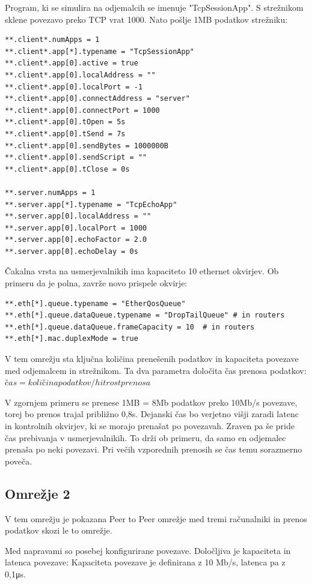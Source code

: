 \documentclass[11pt,a4paper,slovene]{myarticle}
\begin{document}
Program, ki se simulira na odjemalcih se imenuje "TcpSessionApp". S strežnikom sklene povezavo preko TCP vrat 1000. Nato pošlje 1MB podatkov strežniku:
\begin{lstlisting}[h]
**.client*.numApps = 1
**.client*.app[*].typename = "TcpSessionApp"
**.client*.app[0].active = true
**.client*.app[0].localAddress = ""
**.client*.app[0].localPort = -1
**.client*.app[0].connectAddress = "server"
**.client*.app[0].connectPort = 1000
**.client*.app[0].tOpen = 5s
**.client*.app[0].tSend = 7s
**.client*.app[0].sendBytes = 1000000B
**.client*.app[0].sendScript = ""
**.client*.app[0].tClose = 0s

**.server.numApps = 1
**.server.app[*].typename = "TcpEchoApp"
**.server.app[0].localAddress = ""
**.server.app[0].localPort = 1000
**.server.app[0].echoFactor = 2.0
**.server.app[0].echoDelay = 0s
\end{lstlisting}

Čakalna vrsta na usmerjevalnikih ima kapaciteto 10 ethernet okvirjev. Ob primeru da je polna, zavrže novo prispele okvirje:
\begin{lstlisting}[h]
**.eth[*].queue.typename = "EtherQosQueue"
**.eth[*].queue.dataQueue.typename = "DropTailQueue" # in routers
**.eth[*].queue.dataQueue.frameCapacity = 10  # in routers
**.eth[*].mac.duplexMode = true
\end{lstlisting}

V tem omrežju sta ključna količina prenešenih podatkov in kapaciteta povezave med odjemalcem in strežnikom. Ta dva parametra določita čas prenosa podatkov:
$čas = količina podatkov / hitrost prenosa$

V zgornjem primeru se prenese 1MB = 8Mb podatkov preko 10Mb/s povezave, torej bo prenos trajal približno 0,8s. Dejanski čas bo verjetno višji zaradi latenc in kontrolnih okvirjev, ki se morajo prenašat po povezavah.
Zraven pa še pride čas prebivanja v usmerjevalnikih.
To drži ob primeru, da samo en odjemalec prenaša po neki povezavi. Pri večih vzporednih prenosih se čas temu sorazmerno poveča.

\subsection{Omrežje 2}
V tem omrežju je pokazana Peer to Peer omrežje med tremi računalniki in prenos podatkov skozi le to omrežje. 

Med napravami so posebej konfigurirane povezave. Določljiva je kapaciteta in latenca povezave:
Kapaciteta povezave je definirana z 10 Mb/s, latenca pa z 0,1μs.
\end{document}
